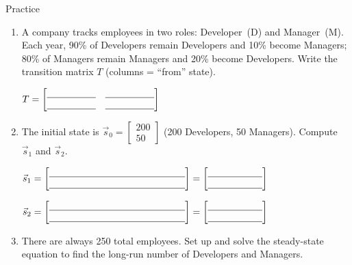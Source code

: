\documentclass[10pt]{article}
\begin{document}
\namedateperiod

\vspace{0.10in}

\begin{notesbox}{Practice}
\begin{enumerate}[leftmargin=1.5em, itemsep=10pt]

    \item A company tracks employees in two roles: Developer~(D) and Manager~(M).
    Each year, 90\% of Developers remain Developers and 10\% become Managers;
    80\% of Managers remain Managers and 20\% become Developers.
    Write the transition matrix $T$ (columns = ``from'' state).

    \vspace{6pt}
    $T = \begin{bmatrix}\blank{1.8cm} & \blank{1.8cm} \\ \blank{1.8cm} & \blank{1.8cm}\end{bmatrix}$

    \vspace{8pt}
    \item The initial state is $\vec{s}_0 = \begin{bmatrix}200\\50\end{bmatrix}$ (200 Developers, 50 Managers).
    Compute $\vec{s}_1$ and $\vec{s}_2$.

    \vspace{6pt}
    $\vec{s}_1 = \begin{bmatrix}\blank{5cm}\\\blank{5cm}\end{bmatrix} = \begin{bmatrix}\blank{2cm}\\\blank{2cm}\end{bmatrix}$

    \vspace{6pt}
    $\vec{s}_2 = \begin{bmatrix}\blank{5cm}\\\blank{5cm}\end{bmatrix} = \begin{bmatrix}\blank{2cm}\\\blank{2cm}\end{bmatrix}$

    \vspace{8pt}
    \item There are always 250 total employees. Set up and solve the steady-state equation to find the
    long-run number of Developers and Managers.


\end{enumerate}
\end{notesbox}
\end{document}
